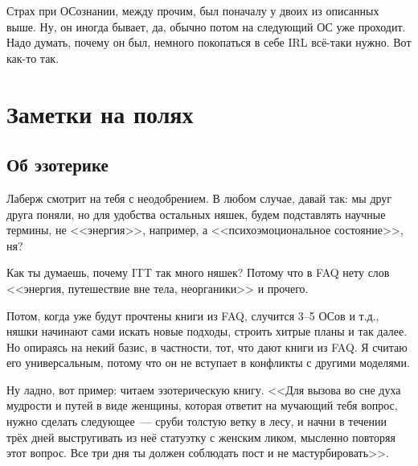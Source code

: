 \documentclass[a4paper,14pt,oneside]{memoir}
\begin{document}
Страх при ОСознании, между прочим, был поначалу у двоих из описанных выше. Ну, он иногда бывает, да, обычно потом на следующий ОС уже проходит. Надо думать, почему он был, немного покопаться в себе IRL всё-таки нужно. Вот как-то так.



\chapter{Заметки на полях}



\section{Об эзотерике}


\medskip

Лаберж смотрит на тебя с неодобрением. В любом случае, давай так: мы друг друга поняли, но для удобства остальных няшек, будем подставлять научные термины, не <<энергия>>, например, а <<психоэмоциональное состояние>>, ня? 

Как ты думаешь, почему ITT так много няшек? Потому что в FAQ нету слов <<энергия, путешествие вне тела, неорганики>> и прочего. 

Потом, когда уже будут прочтены книги из FAQ, случится 3--5 ОСов и т.д., няшки начинают сами искать новые подходы, строить хитрые планы и так далее. Но опираясь на некий базис, в частности, тот, что дают книги из FAQ. Я считаю его универсальным, потому что он не вступает в конфликты с другими моделями. 

Ну ладно, вот пример: читаем эзотерическую книгу. <<Для вызова во сне духа мудрости и путей в виде женщины, которая ответит на мучающий тебя вопрос, нужно сделать следующее~--- сруби толстую ветку в лесу, и начни в течении трёх дней выстругивать из неё статуэтку с женским ликом, мысленно повторяя этот вопрос. Все три дня ты должен соблюдать пост и не мастурбировать>>. 
\end{document}
